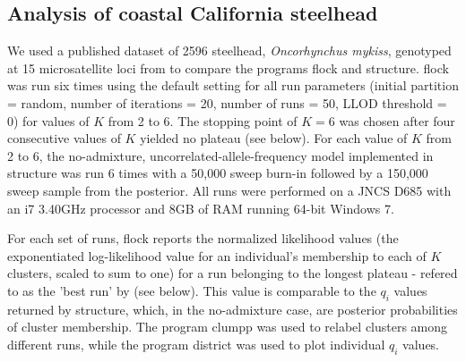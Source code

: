 \subsection*{Analysis of coastal California steelhead} 
We used a published dataset of 2596 steelhead, \textit{Oncorhynchus mykiss},
genotyped at 15 microsatellite loci from \citet{Garzaetal_norcal} to compare the programs
{\sc flock} and {\sc structure}.  {\sc flock} 
was run six times using the default setting for all 
run parameters (initial partition = random, number of iterations = 20, number of runs = 50, 
LLOD threshold = 0) for values of $K$ from 2 to 6. The stopping point of 
$K=6$ was chosen after four consecutive values of $K$
yielded no plateau (see below). For each value of $K$ from 2 to 6, the no-admixture, 
uncorrelated-allele-frequency model implemented in {\sc structure} was run 6 times with 
a 50,000 sweep burn-in followed by a 150,000 sweep sample from the posterior. 
All runs were performed on a JNCS D685 with an i7 3.40GHz processor and 8GB
of RAM running 64-bit Windows 7. 

For each set of runs, {\sc flock} reports the 
normalized likelihood values (the exponentiated log-likelihood value for an individual's 
membership to each of $K$ clusters, scaled to sum to one) for a run belonging to the longest plateau - refered to as the 'best run' by \citep{Duc&Tur2012} (see below).
This value is comparable to the $q_i$ values
returned by {\sc structure}, which, in the no-admixture case, are posterior probabilities of cluster membership.
The program {\sc clumpp} \citep{Jak&Ros2007} was used to relabel clusters among different runs,
while the program {\sc district} \citep{Rosenberg2004} was used to plot individual \textit{$q_i$} values. 

